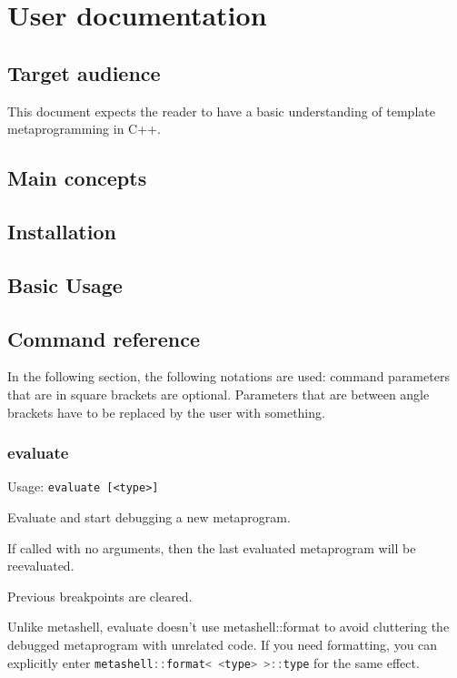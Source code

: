 

\chapter{User documentation}

\section{Target audience}

This document expects the reader to have a basic understanding of template
metaprogramming in C++.

\section{Main concepts}

\section{Installation}

\section{Basic Usage}

\section{Command reference}

In the following section, the following notations are used: command parameters
that are in square brackets are optional. Parameters that are between angle
brackets have to be replaced by the user with something.

\subsection*{evaluate}

Usage: \lstinline$evaluate [<type>]$

Evaluate and start debugging a new metaprogram.

If called with no arguments, then the last evaluated metaprogram will
be reevaluated.

Previous breakpoints are cleared.

Unlike metashell, evaluate doesn't use metashell::format to avoid
cluttering the debugged metaprogram with unrelated code. If you need
formatting, you can explicitly enter
\lstinline[language=C++]|metashell::format< <type> >::type| for the same
effect.

